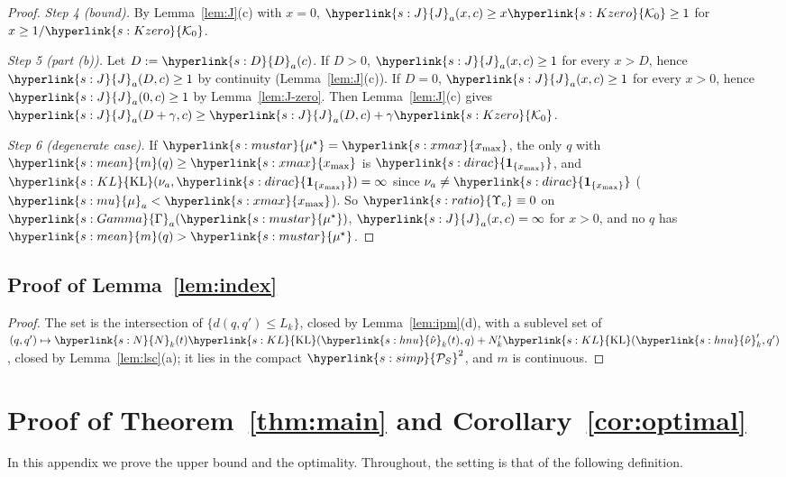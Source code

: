 \documentclass[11pt]{article}
\newcommand{\sy}[2]{{\hyperlink{#1}{#2}}}
\newcommand{\xmax}{\sy{s:xmax}{x_{\max}}}
\newcommand{\Simp}{\sy{s:simp}{\mathcal{P}_{S}}}
\newcommand{\mean}{\sy{s:mean}{m}}
\newcommand{\KL}{\sy{s:KL}{\mathrm{KL}}}
\newcommand{\dirac}{\sy{s:dirac}{\mathbf{1}_{\{x_{\max}\}}}}
\newcommand{\mk}{\sy{s:mu}{\mu}}
\newcommand{\mus}{\sy{s:mustar}{\mu^{\star}}}
\newcommand{\Nc}{\sy{s:N}{N}}
\newcommand{\hnu}{\sy{s:hnu}{\hat\nu}}
\newcommand{\Pairs}{\sy{s:Gamma}{\Gamma}}
\newcommand{\Jf}{\sy{s:J}{J}}
\newcommand{\Dc}{\sy{s:D}{D}}
\newcommand{\Ko}{\sy{s:Kzero}{\mathcal{K}_{0}}}
\newcommand{\Rat}{\sy{s:ratio}{\Upsilon_{c}}}
\begin{document}
\begin{proof}
\emph{Step 4 (bound).} By Lemma~\ref{lem:J}(c) with $x=0$, $\Jf_a(x,c)\ge x\Ko\ge1$ for
$x\ge1/\Ko$.

\emph{Step 5 (part (b)).} Let $D:=\Dc_a(c)$. If $D>0$, $\Jf_a(x,c)\ge1$ for every $x>D$, hence
$\Jf_a(D,c)\ge1$ by continuity (Lemma~\ref{lem:J}(c)). If $D=0$, $\Jf_a(x,c)\ge1$ for every $x>0$,
hence $\Jf_a(0,c)\ge1$ by Lemma~\ref{lem:J-zero}. Then Lemma~\ref{lem:J}(c) gives
$\Jf_a(D+\gamma,c)\ge \Jf_a(D,c)+\gamma\Ko$.

\emph{Step 6 (degenerate case).} If $\mus=\xmax$, the only $q$ with $\mean(q)\ge\xmax$ is $\dirac$,
and $\KL(\nu_a,\dirac)=\infty$ since $\nu_a\ne\dirac$ ($\mk_a<\xmax$). So $\Rat\equiv0$ on
$\Pairs_a(\mus)$, $\Jf_a(x,c)=\infty$ for $x>0$, and no $q$ has $\mean(q)>\mus$.
\end{proof}

\subsection{Proof of Lemma~\ref{lem:index}}\label{sec:proof-lem-index}

\begin{proof}
The set is the intersection of $\{d(q,q')\le L_k\}$, closed by Lemma~\ref{lem:ipm}(d), with a
sublevel set of $(q,q')\mapsto \Nc_k(t)\KL(\hnu_k(t),q)+N'_k\KL(\hnu'_k,q')$, closed by
Lemma~\ref{lem:lsc}(a); it lies in the compact $\Simp^2$, and $m$ is continuous.
\end{proof}

\section{\texorpdfstring{Proof of Theorem~\ref{thm:main} and Corollary~\ref{cor:optimal}}{Proof of Theorem 6.1 and Corollary 6.2}}\label{sec:proof-upper}

In this appendix we prove the upper bound and the optimality. Throughout, the setting is that of
the following definition.
\end{document}
